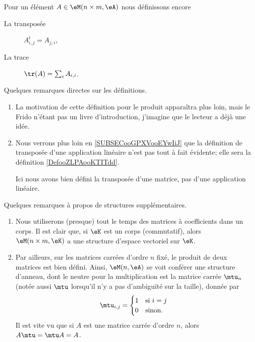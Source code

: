 \begin{definition}
	Pour un élément \( A\in \eM(n\times m, \eA)\) nous définissons encore
	\begin{description}
		\item[La transposée] \( A^t_{i,j}=A_{j,i}\),
		\item[La trace] \( \tr(A)=\sum_iA_{i,i}\).
	\end{description}
\end{definition}


\begin{remark}
	Quelques remarques directes sur les définitions.
	\begin{enumerate}
		\item
		      La motivation de cette définition pour le produit apparaîtra plus loin, mais le Frido n'étant pas un livre d'introduction, j'imagine que le lecteur a déjà une idée.
		\item
		      Nous verrons plus loin en \ref{SUBSECooGPXVooEYwIiJ} que la définition de transposée d'une application linéaire n'est pas tout à fait évidente; elle sera la définition \ref{DefooZLPAooKTITdd}.

		      Ici nous avons bien défini la transposée d'une matrice, pas d'une application linéaire.
	\end{enumerate}
\end{remark}

\begin{remark}
	Quelques remarques à propos de structures supplémentaires.
	\begin{enumerate}
		\item Nous utiliserons (presque) tout le temps des matrices à coefficients dans un corps. Il est clair que, si \( \eK \) est un corps (commutatif), alors \( \eM(n\times m,\eK) \) a une structure d'espace vectoriel sur \( \eK \).
		\item Par ailleurs, sur les matrices carrées d'ordre \( n \) fixé, le produit de deux matrices est bien défini. Ainsi, \( \eM(n,\eA)\) se voit conférer une structure d'anneau, dont le neutre pour la multiplication est la matrice carrée \( \mtu_n\) (notée aussi \( \mtu\) lorsqu'il n'y a pas d'ambiguïté sur la taille), donnée par
		      \begin{equation}
			      \mtu_{i,j}=\begin{cases}
				      1 & \text{si } i=j \\
				      0 & \text{sinon.}
			      \end{cases}
		      \end{equation}
		      Il est vite vu que si \( A\) est une matrice carrée d'ordre \( n \), alors \( A\mtu=\mtu A=A\).
	\end{enumerate}
\end{remark}

